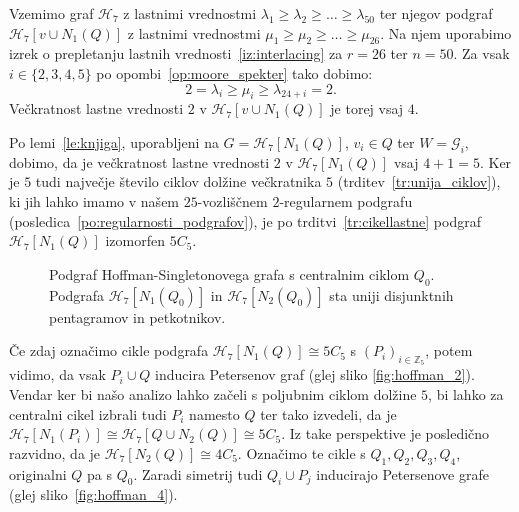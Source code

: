 \documentclass[fin1, tisk]{fmfdelo}
\newcommand{\gr}{\mathscr{G}}
\newcommand{\hof}{\mathscr{H}_{7}}
\begin{document}
\begin{dokaz}
    Vzemimo graf $\hof$ z lastnimi vrednostmi 
    $\lambda_1 \geq \lambda_2 \geq \ldots \geq \lambda_{50}$ ter njegov podgraf 
    $\hof[v \cup N_1(Q)]$ z lastnimi vrednostmi 
    $\mu_1 \geq \mu_2 \geq \ldots \geq \mu_{26}$. Na njem uporabimo izrek o 
    prepletanju lastnih vrednosti~\ref{iz:interlacing} za $r=26$ ter $n=50$.
    Za vsak $i \in \{2, 3, 4, 5\}$ po opombi~\ref{op:moore_spekter} tako dobimo:
    \[2 = \lambda_i \geq \mu_i \geq \lambda_{24 + i} = 2.\]
    Večkratnost lastne vrednosti $2$ v $\hof[v \cup N_1(Q)]$ je torej vsaj $4$.

    Po lemi~\ref{le:knjiga}, uporabljeni na
    $G = \hof[N_1(Q)]$, $v_i \in Q$ ter $W = \gr_i$, dobimo, da je večkratnost lastne vrednosti $2$
    v $\hof[N_1(Q)]$ vsaj $4+1=5$. Ker je $5$ tudi naj\-več\-je število ciklov dolžine večkratnika $5$ (trditev~\ref{tr:unija_ciklov}), 
    ki jih lahko
    imamo v našem $25$-vozliščnem $2$-regularnem podgrafu (posledica~\ref{po:regularnosti_podgrafov}), je 
    po trditvi~\ref{tr:cikellastne} podgraf $\hof[N_1(Q)]$ 
    izomorfen $5C_5$.
\end{dokaz}

\begin{figure}[ht]
    \centering
    \def\svgwidth{\columnwidth}
    \caption{Podgraf Hoffman-Singletonovega grafa s centralnim ciklom $Q_0$. Podgrafa $\hof[N_1(Q_0)]$ in $\hof[N_2(Q_0)]$ 
    sta uniji disjunktnih pentagramov in petkotnikov.}
    \label{fig:hoffman_3}
\end{figure}

\begin{opomba}\label{op:cikla_petersen}
Če zdaj označimo cikle podgrafa $\hof[N_1(Q)] \cong 5C_5$ s $(P_i)_{i\in\mathbb{Z}_5}$, potem vidimo, da vsak
$P_i \cup Q$ inducira Petersenov graf (glej sliko \ref{fig:hoffman_2}).
Vendar ker bi našo analizo lahko začeli s poljubnim ciklom dolžine $5$,
bi lahko za centralni cikel izbrali tudi $P_i$ namesto $Q$ 
ter tako izvedeli, da je $\hof[N_1(P_i)] \cong \hof[Q \cup N_2(Q)] \cong 5C_5$. Iz take perspektive je posledično
razvidno, da je $\hof[N_2(Q)] \cong 4C_5$.
Označimo te cikle s $Q_1, Q_2, Q_3, Q_4$,
originalni $Q$ pa s $Q_0$. Zaradi simetrij tudi $Q_i \cup P_j$ inducirajo Petersenove grafe (glej sliko~\ref{fig:hoffman_4}).
\end{opomba}
\end{document}

